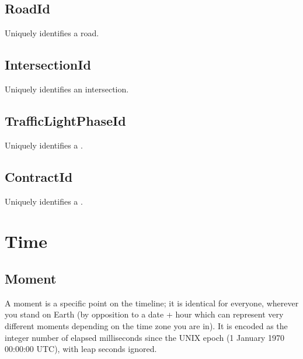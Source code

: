 \documentclass[letterpaper,10pt,english]{sphinxmanual}
\begin{document}
\subsection{RoadId}
\label{\detokenize{taxonomy_serialization:roadid}}\label{\detokenize{taxonomy_serialization:road-id}}
Uniquely identifies a road.


\subsection{IntersectionId}
\label{\detokenize{taxonomy_serialization:intersectionid}}\label{\detokenize{taxonomy_serialization:intersection-id}}
Uniquely identifies an intersection.


\subsection{TrafficLightPhaseId}
\label{\detokenize{taxonomy_serialization:trafficlightphaseid}}\label{\detokenize{taxonomy_serialization:traffic-light-phase-id}}
Uniquely identifies a {\hyperref[\detokenize{taxonomy_serialization:traffic-light-phase}]{}}.


\subsection{ContractId}
\label{\detokenize{taxonomy_serialization:contractid}}\label{\detokenize{taxonomy_serialization:contract-id}}
Uniquely identifies a {\hyperref[\detokenize{taxonomy_serialization:contract}]{}}.


\section{Time}
\label{\detokenize{taxonomy_serialization:time}}

\subsection{Moment}
\label{\detokenize{taxonomy_serialization:moment}}\label{\detokenize{taxonomy_serialization:id1}}
A moment is a specific point on the timeline; it is identical for everyone, wherever you stand on Earth (by opposition to a date + hour which can represent very different moments depending on the time zone you are in).
It is encoded as the integer number of elapsed milliseconds since the UNIX epoch (1 January 1970 00:00:00 UTC), with leap seconds ignored.
\end{document}
